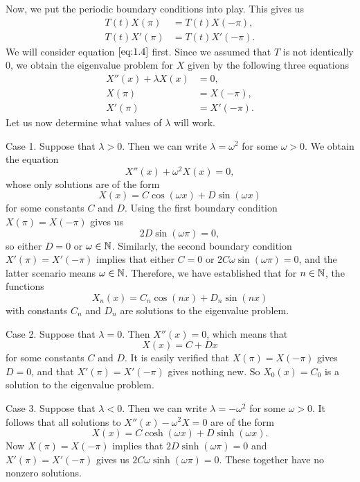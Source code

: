 Now, we put the periodic boundary conditions into play. This gives us 
\begin{align*}
    T(t) X(\pi) &= T(t) X(-\pi), \\ 
    T(t) X'(\pi) &= T(t) X'(-\pi). 
\end{align*}
We will consider equation $\eqref{eq:1.4}$ first. Since we assumed that 
$T$ is not identically $0$, we obtain the eigenvalue 
problem for $X$ given by the following three equations 
\begin{align*}
    X''(x) + \lambda X(x) &= 0, \\
    X(\pi) &= X(-\pi), \\
    X'(\pi) &= X'(-\pi).
\end{align*}
Let us now determine what values of $\lambda$ will work. 

{\sc Case 1.} Suppose that $\lambda > 0$. Then we can write $\lambda = \omega^2$
for some $\omega > 0$. We obtain the equation 
\[ X''(x) + \omega^2 X(x) = 0, \] 
whose only solutions are of the form 
\[ X(x) = C\cos(\omega x) + D\sin(\omega x) \] 
for some constants $C$ and $D$. Using the first boundary condition 
$X(\pi) = X(-\pi)$ gives us 
\[ 2D\sin(\omega\pi) = 0, \] 
so either $D = 0$ or $\omega \in \mathbb{N}$. Similarly, the second boundary 
condition $X'(\pi) = X'(-\pi)$ implies that either $C = 0$ or 
$2C\omega\sin(\omega\pi) = 0$, and the latter scenario means $\omega \in \mathbb{N}$. 
Therefore, we have established that for $n \in \mathbb{N}$, the functions 
\[ X_n(x) = C_n \cos(nx) + D_n \sin(nx) \] 
with constants $C_n$ and $D_n$ are solutions to the eigenvalue problem. 

{\sc Case 2.} Suppose that $\lambda = 0$. Then $X''(x) = 0$, which means that 
\[ X(x) = C + Dx \] 
for some constants $C$ and $D$. It is easily verified that $X(\pi) = X(-\pi)$
gives $D = 0$, and that $X'(\pi) = X'(-\pi)$ gives nothing new. So 
$X_0(x) = C_0$ is a solution to the eigenvalue problem. 

{\sc Case 3.} Suppose that $\lambda < 0$. Then we can write $\lambda = 
-\omega^2$ for some $\omega > 0$. It follows that all solutions to 
$X''(x) - \omega^2 X = 0$ are of the form 
\[ X(x) = C \cosh(\omega x) + D \sinh(\omega x). \] 
Now $X(\pi) = X(-\pi)$ implies that $2D\sinh(\omega\pi) = 0$ and 
$X'(\pi) = X'(-\pi)$ gives us $2C\omega\sinh(\omega\pi) = 0$. These 
together have no nonzero solutions.

